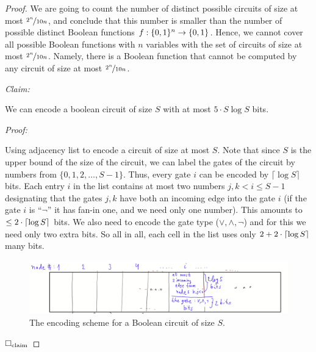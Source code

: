 \begin{proof}
We are going to count the number of distinct possible circuits of size at most $\nicefrac{2^n}{10 n}$, and conclude that this number is smaller than the number of possible distinct Boolean functions $f:\{0,1\}^n\to\{0,1\}$. Hence, we cannot cover all possible Boolean functions with $n$ variables with the set of circuits of size at most $\nicefrac{2^n}{10 n}$. Namely, there is a Boolean function that cannot be computed by any circuit of size at most $\nicefrac{2^n}{10 n}$. 

\renewenvironment{claim}{%
    \vspace{6pt} 
    \noindent\textit{Claim:} %
    \itshape %
}{%
    \par %
}

\newenvironment{proofclaim}{%
    \vspace{6pt} 
    \noindent\textit{Proof:} %
}{%
    \hfill$\Box_{\rm claim}$\par\vspace{10pt} %
}



\begin{claim}
We can encode a boolean circuit of size $S$ with at most $5\cdot S \log S$ bits.
\end{claim}

\begin{proofclaim}
Using adjacency list to encode a circuit of size at most $S$.   Note that since $S$ is the upper bound of the size of the circuit, we can label the gates of the circuit by numbers from $\{0,1,2,\dots,S-1\}$. Thus, every gate $i$ can be encoded by $\lceil \log S \rceil$ bits.  Each entry $i$ in the list contains at most two numbers $j,k<i\le S-1$ designating that the gates $j,k$ have both an incoming edge into the gate $i$ (if the gate $i$ is ``$\neg$'' it has fan-in one, and we need only one number). This amounts to $\le 2\cdot \lceil\log S\rceil$ bits. We also need to encode the gate type ($\lor,\land,\neg$) and for this we need only two extra bits. So all in all, each cell in the list uses only $2+2\cdot\lceil\log S\rceil$ many bits.
\begin{figure}[H]
    \centering
    \includegraphics[width=1.1\linewidth]{images/shannon_table.png}
    \caption{The encoding scheme for a Boolean circuit of size $S$.}
    \label{fig:enter-label}
\end{figure}



\end{proofclaim}
\end{proof}

